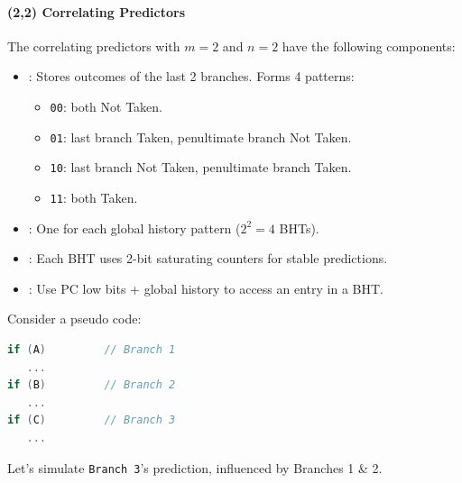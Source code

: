 \paragraph{(2,2) Correlating Predictors}

The correlating predictors with $m=2$ and $n=2$ have the following components:
\begin{itemize}
    \item {}: Stores outcomes of the last 2 branches. Forms 4 patterns:
    \begin{itemize}
        \item \texttt{00}: both Not Taken.
        \item \texttt{01}: last branch Taken, penultimate branch Not Taken.
        \item \texttt{10}: last branch Not Taken, penultimate branch Taken.
        \item \texttt{11}: both Taken.
    \end{itemize}
    \item {}: One for each global history pattern ($2^{2} = 4$ BHTs).
    \item {}: Each BHT uses 2-bit saturating counters for stable predictions.
    \item {}: Use PC low bits + global history to access an entry in a BHT.
\end{itemize}
Consider a pseudo code:
\begin{lstlisting}[language=c]
if (A)         // Branch 1
   ...
if (B)         // Branch 2
   ...
if (C)         // Branch 3
   ...
\end{lstlisting}
Let's simulate \texttt{Branch 3}'s prediction, influenced by Branches 1 \& 2.
